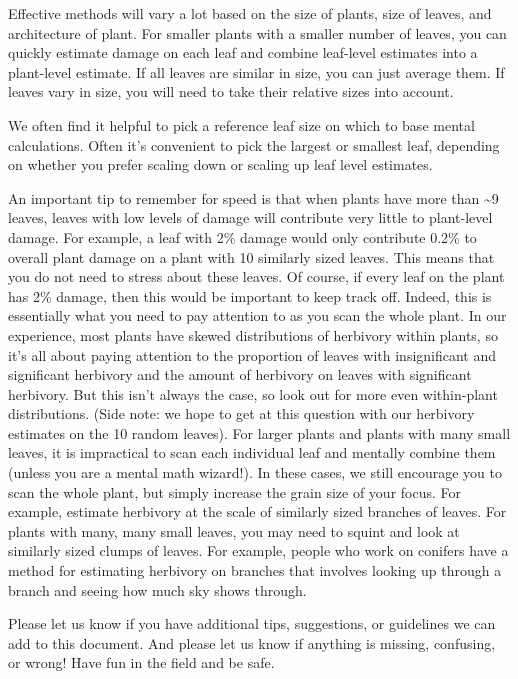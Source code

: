 \documentclass[
  letterpaper,
  oneside,
  open=any]{scrbook}
\begin{document}
Effective methods will vary a lot based on the size of plants, size of
leaves, and architecture of plant. For smaller plants with a smaller
number of leaves, you can quickly estimate damage on each leaf and
combine leaf-level estimates into a plant-level estimate. If all leaves
are similar in size, you can just average them. If leaves vary in size,
you will need to take their relative sizes into account.

We often find it helpful to pick a reference leaf size on which to base
mental calculations. Often it's convenient to pick the largest or
smallest leaf, depending on whether you prefer scaling down or scaling
up leaf level estimates.

An important tip to remember for speed is that when plants have more
than \textasciitilde9 leaves, leaves with low levels of damage will
contribute very little to plant-level damage. For example, a leaf with
2\% damage would only contribute 0.2\% to overall plant damage on a
plant with 10 similarly sized leaves. This means that you do not need to
stress about these leaves. Of course, if every leaf on the plant has 2\%
damage, then this would be important to keep track off. Indeed, this is
essentially what you need to pay attention to as you scan the whole
plant. In our experience, most plants have skewed distributions of
herbivory within plants, so it's all about paying attention to the
proportion of leaves with insignificant and significant herbivory and
the amount of herbivory on leaves with significant herbivory. But this
isn't always the case, so look out for more even within-plant
distributions. (Side note: we hope to get at this question with our
herbivory estimates on the 10 random leaves). For larger plants and
plants with many small leaves, it is impractical to scan each individual
leaf and mentally combine them (unless you are a mental math wizard!).
In these cases, we still encourage you to scan the whole plant, but
simply increase the grain size of your focus. For example, estimate
herbivory at the scale of similarly sized branches of leaves. For plants
with many, many small leaves, you may need to squint and look at
similarly sized clumps of leaves. For example, people who work on
conifers have a method for estimating herbivory on branches that
involves looking up through a branch and seeing how much sky shows
through.

Please let us know if you have additional tips, suggestions, or
guidelines we can add to this document. And please let us know if
anything is missing, confusing, or wrong! Have fun in the field and be
safe.
\end{document}
